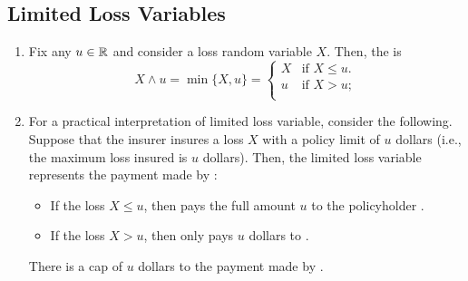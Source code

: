 \subsection{Limited Loss Variables}
\begin{enumerate}
\item Fix any \(u\in\mathbb{R}\) and consider a loss random variable \(X\). Then, the
 is
\[
X\wedge u=\min\{X,u\}=
\begin{cases}
X&\text{if }X\le u.\\
u&\text{if }X>u;\\
\end{cases}
\]
\item For a practical interpretation of limited loss variable, consider the
following. Suppose that the insurer  insures a loss \(X\)
with a policy limit of \(u\) dollars (i.e., the maximum loss insured is \(u\)
dollars). Then, the limited loss variable represents the payment made by
:
\begin{itemize}
\item If the loss \(X\le u\), then  pays the full amount \(u\) to
the policyholder .
\item If the loss \(X>u\), then  only pays \(u\) dollars to .
\end{itemize}
There is a cap of \(u\) dollars to the payment made by .


\end{enumerate}
